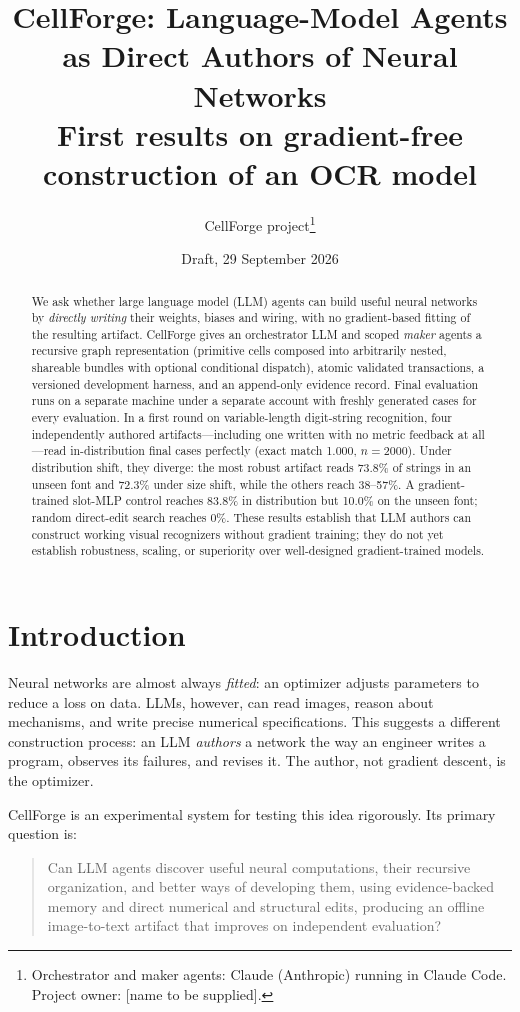 \documentclass[11pt]{article}
\title{CellForge: Language-Model Agents as Direct Authors of Neural Networks\\
\large First results on gradient-free construction of an OCR model}
\author{CellForge project\thanks{Orchestrator and maker agents: Claude (Anthropic) running in Claude Code. Project owner: [name to be supplied].}}
\date{Draft, 29 September 2026}
\begin{document}
\maketitle

\begin{abstract}
We ask whether large language model (LLM) agents can build useful neural networks by
\emph{directly writing} their weights, biases and wiring, with no gradient-based fitting of
the resulting artifact. CellForge gives an orchestrator LLM and scoped \emph{maker} agents a
recursive graph representation (primitive cells composed into arbitrarily nested, shareable
bundles with optional conditional dispatch), atomic validated transactions, a versioned
development harness, and an append-only evidence record. Final evaluation runs on a separate
machine under a separate account with freshly generated cases for every evaluation.
In a first round on variable-length digit-string recognition, four independently authored
artifacts---including one written with no metric feedback at all---read in-distribution
final cases perfectly (exact match 1.000, $n=2000$). Under distribution shift, they diverge:
the most robust artifact reads 73.8\% of strings in an unseen font and 72.3\% under size
shift, while the others reach 38--57\%. A gradient-trained slot-MLP control reaches 83.8\%
in distribution but 10.0\% on the unseen font; random direct-edit search reaches 0\%.
These results establish that LLM authors can construct working visual recognizers without
gradient training; they do not yet establish robustness, scaling, or superiority over
well-designed gradient-trained models.
\end{abstract}

\section{Introduction}
Neural networks are almost always \emph{fitted}: an optimizer adjusts parameters to reduce a
loss on data. LLMs, however, can read images, reason about mechanisms, and write precise
numerical specifications. This suggests a different construction process: an LLM
\emph{authors} a network the way an engineer writes a program, observes its failures, and
revises it. The author, not gradient descent, is the optimizer.

CellForge is an experimental system for testing this idea rigorously. Its primary question is:
\begin{quote}
Can LLM agents discover useful neural computations, their recursive organization, and better
ways of developing them, using evidence-backed memory and direct numerical and structural
edits, producing an offline image-to-text artifact that improves on independent evaluation?
\end{quote}
\end{document}
